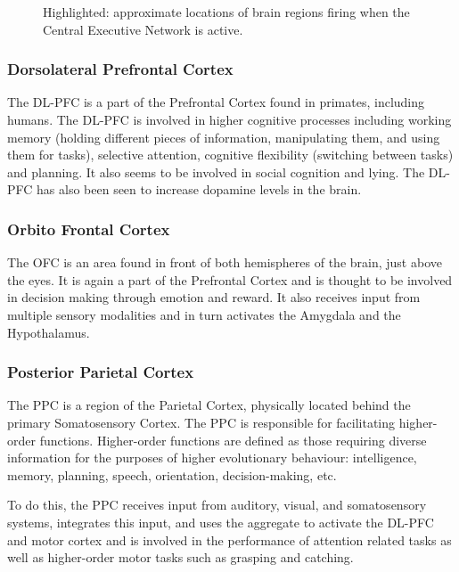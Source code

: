 \documentclass[a4paper, amsfonts, amssymb, amsmath, reprint, showkeys, nofootinbib, twoside]{revtex4-1}
\begin{document}
\begin{figure}[h!]
\begin{subfigure}[b]{0.48\linewidth}
  \end{subfigure}
  \caption{Highlighted: approximate locations of brain regions firing when the Central Executive Network is active.}
  \label{fig:cen}
\end{figure}

\subsubsection{Dorsolateral Prefrontal Cortex}

The DL-PFC is a part of the Prefrontal Cortex found in primates, including
humans. The DL-PFC is involved in higher cognitive processes including working memory
(holding different pieces of information, manipulating them, and using them for
tasks), selective attention, cognitive flexibility (switching between tasks) and
planning. It also seems to be involved in social cognition and lying. The DL-PFC has
also been seen to increase dopamine levels in the brain. \cite{dlpfcmemory,dlpfctasks,dlpfclying}

\subsubsection{Orbito Frontal Cortex}

The OFC is an area found in front of both hemispheres of the brain, just above the
eyes. It is again a part of the Prefrontal Cortex and is thought to be involved in
decision making through emotion and reward. It also receives input from multiple
sensory modalities and in turn activates the Amygdala and the
Hypothalamus. \cite{theprefrontalcortex,ofcprimates,theorbitofrontalcortex}

\subsubsection{Posterior Parietal Cortex}
The PPC is a region of the Parietal Cortex, physically located behind the primary
Somatosensory Cortex. The PPC is responsible for facilitating higher-order
functions. Higher-order functions are defined as those requiring diverse information
for the purposes of higher evolutionary behaviour: intelligence, memory, planning,
speech, orientation, decision-making, etc.

To do this, the PPC receives input from auditory, visual, and somatosensory
systems, integrates this input, and uses the aggregate to activate the DL-PFC and motor cortex and is
involved in the performance of attention related tasks as well as higher-order motor
tasks such as grasping and catching. \cite{parietallobesa,parietallobes}
\end{document}
